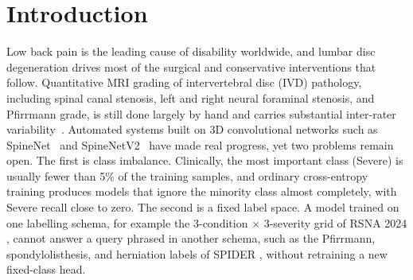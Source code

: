 \documentclass[runningheads]{llncs}
\begin{document}
\section{Introduction}\label{sec1}

Low back pain is the leading cause of disability worldwide, and lumbar disc degeneration drives most of the surgical and conservative interventions that follow. Quantitative MRI grading of intervertebral disc (IVD) pathology, including spinal canal stenosis, left and right neural foraminal stenosis, and Pfirrmann grade, is still done largely by hand and carries substantial inter-rater variability~\cite{nigru2024}. Automated systems built on 3D convolutional networks such as SpineNet~\cite{jamaludin2017} and SpineNetV2~\cite{windsor2022} have made real progress, yet two problems remain open. The first is class imbalance. Clinically, the most important class (Severe) is usually fewer than 5\% of the training samples, and ordinary cross-entropy training produces models that ignore the minority class almost completely, with Severe recall close to zero. The second is a fixed label space. A model trained on one labelling schema, for example the 3-condition $\times$ 3-severity grid of RSNA 2024 \cite{kaggle2024}, cannot answer a query phrased in another schema, such as the Pfirrmann, spondylolisthesis, and herniation labels of SPIDER \cite{vandergraaf2024spider}, without retraining a new fixed-class head.
\end{document}

